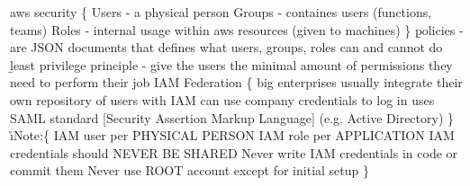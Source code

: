 aws security \{
  \> Users - a physical person 
  \> Groups - containes users (functions, teams) 
  \> Roles - internal usage within aws resources (given to machines) 
  \<
\}
\b{policies} - are JSON documents that defines what users, groups, roles can and cannot do \\
\b{least privilege principle} - give the users the minimal amount of permissions they need to perform their job
IAM Federation \{
  \> big enterprises usually integrate their own repository of users with IAM
  \> can use company credentials to log in
  \> uses SAML standard [Security Assertion Markup Language] (e.g. Active Directory)
  \<
\}
\r{\i{Note:}}\{
   IAM user per PHYSICAL PERSON
   IAM role per APPLICATION
  \> IAM credentials should NEVER BE SHARED 
  \> Never write IAM credentials in code or commit them
  \> Never use ROOT account except for initial setup
\}